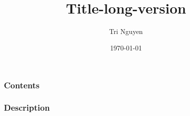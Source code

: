 \documentclass[10pt,xcolor={usenames,dvipsnames,table}]{beamer}
\title[Title]{Title-long-version} %
\author{Tri Nguyen} %
\institute[OSU] %
{
Oregon State University \\\\ %
}
\date{\today} %
\begin{document}


\begin{frame}
\frametitle{Contents} %
\tableofcontents %
\end{frame}

\begin{frame}
\frametitle{Description}
\end{frame}
\end{document}
